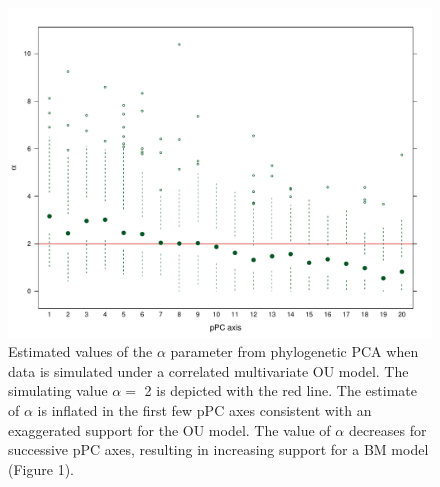 \documentclass[12pt,twoside]{article}
\begin{document}
\begin{figure}[p]
\centering
\includegraphics[scale=0.65]{fig/alpha-est-corr.pdf}
\caption[Estimates of the $\alpha$ parameter from phylogenetic PCA on correlated OU]{Estimated values of the $\alpha$ parameter from phylogenetic PCA when data is simulated under a correlated multivariate OU model. The simulating value $\alpha=$ 2 is depicted with the red line. The estimate of $\alpha$ is inflated in the first few pPC axes consistent with an exaggerated support for the OU model. The value of $\alpha$ decreases for successive pPC axes, resulting in increasing support for a BM model (Figure 1).}
\label{alpha-cor}
\end{figure}
\end{document}
